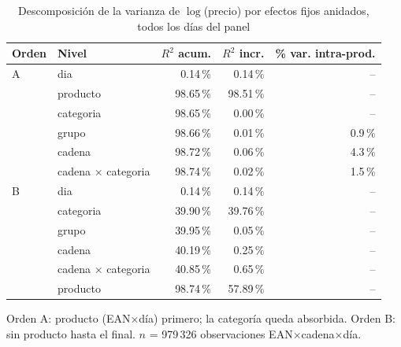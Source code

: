 \begin{table}[htbp]
\caption{Descomposici\'on de la varianza de $\log$(precio) por efectos fijos anidados, todos los d\'ias del panel}
\label{tab:varianza}
\centering\scriptsize\setlength{\tabcolsep}{3pt}
\begin{tabular}{@{}llrrr@{}}
\toprule
Orden & Nivel & $R^2$ acum. & $R^2$ incr. & \% var. intra-prod. \\
\midrule
A & dia & 0.14\,\% & 0.14\,\% & -- \\
 & producto & 98.65\,\% & 98.51\,\% & -- \\
 & categoria & 98.65\,\% & 0.00\,\% & -- \\
 & grupo & 98.66\,\% & 0.01\,\% & 0.9\,\% \\
 & cadena & 98.72\,\% & 0.06\,\% & 4.3\,\% \\
 & cadena $\times$ categoria & 98.74\,\% & 0.02\,\% & 1.5\,\% \\
\midrule
B & dia & 0.14\,\% & 0.14\,\% & -- \\
 & categoria & 39.90\,\% & 39.76\,\% & -- \\
 & grupo & 39.95\,\% & 0.05\,\% & -- \\
 & cadena & 40.19\,\% & 0.25\,\% & -- \\
 & cadena $\times$ categoria & 40.85\,\% & 0.65\,\% & -- \\
 & producto & 98.74\,\% & 57.89\,\% & -- \\
\bottomrule\end{tabular}
\par\smallskip\raggedright\scriptsize Orden A: producto (EAN$\times$d\'ia) primero; la categor\'ia queda absorbida. Orden B: sin producto hasta el final. $n$ = 979\,326 observaciones EAN$\times$cadena$\times$d\'ia.
\end{table}
